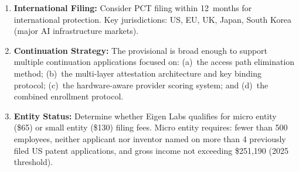 \documentclass[11pt,letterpaper]{article}
\begin{document}
\begin{enumerate}[nosep]
\item \textbf{International Filing:} Consider PCT filing within 12~months for international protection. Key jurisdictions: US, EU, UK, Japan, South Korea (major AI infrastructure markets).

\item \textbf{Continuation Strategy:} The provisional is broad enough to support multiple continuation applications focused on: (a)~the access path elimination method; (b)~the multi-layer attestation architecture and key binding protocol; (c)~the hardware-aware provider scoring system; and (d)~the combined enrollment protocol.

\item \textbf{Entity Status:} Determine whether Eigen Labs qualifies for micro entity (\$65) or small entity (\$130) filing fees. Micro entity requires: fewer than 500 employees, neither applicant nor inventor named on more than 4 previously filed US patent applications, and gross income not exceeding \$251,190 (2025 threshold).
\end{enumerate}
\end{document}
